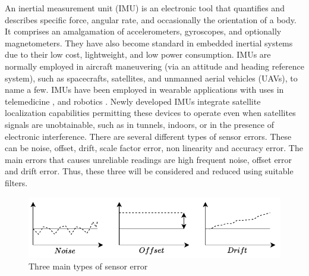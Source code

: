 An inertial measurement unit (IMU) is an electronic tool that quantifies and describes specific force, angular rate, and occasionally the orientation of a body. It comprises an amalgamation of accelerometers, gyroscopes, and optionally magnetometers. They have also become standard in embedded inertial systems due to their low cost, lightweight, and low power consumption. IMUs are normally employed in aircraft maneuvering (via an attitude and heading reference system), such as spacecrafts, satellites, and unmanned aerial vehicles (UAVs), to name a few. IMUs have been employed in wearable applications with uses in  telemedicine \cite{madgwick2020extended}, and robotics \cite{wilson2019formulation}. Newly developed IMUs integrate satellite localization capabilities permitting these devices to operate even when satellites signals are unobtainable, such as in tunnels, indoors, or in the presence of electronic interference.
There are several different types of sensor errors. These can be noise, offset, drift, scale factor error, non linearity and accuracy error. The main errors that causes unreliable readings are high frequent noise, offset error and drift error. Thus, these three will be considered and reduced using suitable filters.

\begin{figure}[!h]
    \centering
    \includegraphics[width=1\textwidth]{figures/noise.pdf}
    \caption{Three main types of sensor error}
    \label{fig:noise}
\end{figure}

